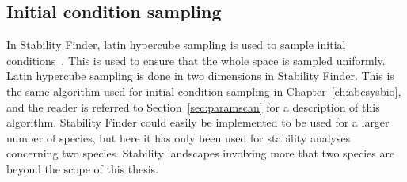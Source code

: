 \subsection{Initial condition sampling}
\label{sec:init_cond_samp}
In Stability Finder, latin hypercube sampling is used to sample initial conditions~\autocite{MCKAY:2000vt}. This is used to ensure that the whole space is sampled uniformly. Latin hypercube sampling is done in two dimensions in Stability Finder. This is the same algorithm used for initial condition sampling in Chapter~\ref{ch:abcsysbio}, and the reader is referred to Section~\ref{sec:paramscan} for a description of this algorithm. Stability Finder could easily be implemented to be used for a larger number of species, but here it has only been used for stability analyses concerning two species. Stability landscapes involving more that two species are beyond the scope of this thesis. %



\clearpage

%
 
